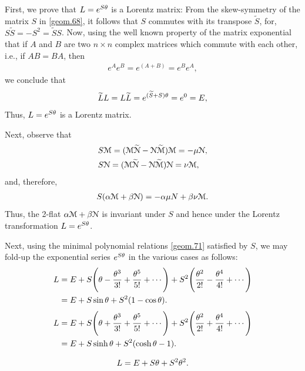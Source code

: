 {\prf First, we prove that $L =e^{S{\theta}}$ is a Lorentz 
matrix: From the skew-symmetry of the matrix $S$ in 
\eqref{geom.68}, it follows that $S$ commutes with its 
transpose $\tilde{S}$, for,   
$S\tilde{S}=-S^2=\tilde{S}S$. Now, using the well 
known 
property of the matrix exponential that if $A$ and $B$ 
are two $n\times n$ complex matrices which {commute}  
with each other, i.e., if $AB=BA$, then
\begin{align*}
e^Ae^B=e^{(A+B)}=e^Be^A,
\end{align*}
we conclude  that
\begin{align}\label{geom.73}
\widetilde{L}L=L\widetilde{L}=e^{(\widetilde{S}+S){\theta}} =e^0=E,
\end{align}
Thus, $ L =e^{S{\theta}}$ is a {Lorentz matrix}.

\noindent Next, observe that
\begin{align} \label{geom.75}
&S\EuScript{M}=(\EuScript{M}\EuScript{\widetilde{N}}
-\EuScript{N}\EuScript{\widetilde{M}})\EuScript{M}
=-{\mu}\EuScript{N},\\
&S\EuScript{N}=(\EuScript{M}\EuScript{\widetilde{N}}
-\EuScript{N}\EuScript{\widetilde{M}})\EuScript{N}
={\nu}\EuScript{M},\label{geom.75a}
\end{align}
and, therefore,
\begin{align}\label{geom.76}
S({\alpha}\EuScript{M}+{\beta}\EuScript{N})=
-{\alpha}{\mu} N+{\beta}{\nu}\EuScript{M}.
\end{align}
Thus, the 2-flat ${\alpha}\EuScript{M}+{\beta}\EuScript{N}$ is
invariant under $S$ and hence under the Lorentz 
transformation $L=e^{S{\theta}}$.

Next, using the minimal polynomial relations 
\eqref{geom.71} satisfied by $S$, we may fold-up the 
exponential series $e^{S{\theta}}$ in the various cases as 
follows: 
\begin{align} \label{geom.77}
L&= E + S\Bigg({\theta}-\frac{{\theta}^3}{3!}
+\frac{{\theta}^5}{5!} +\cdots\Bigg)
+S^2\Bigg(\frac{{\theta}^2}{2!}-
\frac{{\theta}^4}{4!} +\cdots\Bigg)\notag\\
&=E+S\sin{\theta}+S^2(1-\cos{\theta}).
\end{align}
\begin{align} \label{geom.78}
L&= E + S\Bigg({\theta}+\frac{{\theta}^3}{3!}
+\frac{{\theta}^5}{5!} +\cdots\Bigg) +
S^2\Bigg(\frac{{\theta}^2}{2!}+
\frac{{\theta}^4}{ 4!} +\cdots\Bigg)\notag\\
&=E+S\sinh{\theta}+S^2(\cosh{\theta}-1).
\end{align}

\begin{align} \label{geom.79}
L= E + S{\theta}+ S^2{\theta}^2.
\end{align}

}
